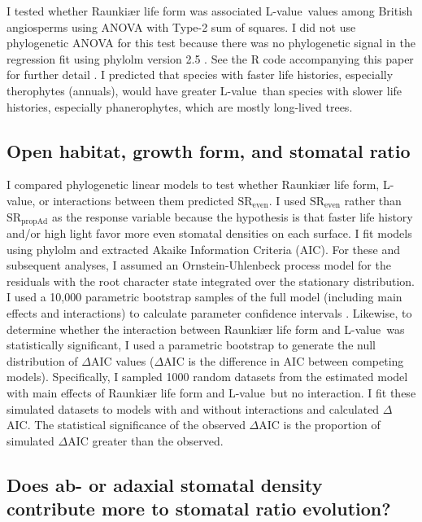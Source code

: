 \documentclass[12pt, oneside]{article}
\newcommand{\pkg}[1]{{\fontseries{b}\selectfont #1}}
\newcommand{\el}{L-value}
\begin{document}
I tested whether Raunki\ae r life form was associated \el~values among British angiosperms using ANOVA with Type-2 sum of squares. I did not use phylogenetic ANOVA for this test because there was no phylogenetic signal in the regression fit using \pkg{phylolm} version 2.5 \citep{Ho_Ane_2014}. See the R code accompanying this paper for further detail \citep{Muir_dryad}. I predicted that species with faster life histories, especially therophytes (annuals), would have greater \el~than species with slower life histories, especially phanerophytes, which are mostly long-lived trees. 

\subsection*{Open habitat, growth form, and stomatal ratio}

  
I compared phylogenetic linear models to test whether Raunki\ae r life form, \el, or interactions between them predicted $\textrm{SR}_\textrm{even}$. I used $\textrm{SR}_\textrm{even}$ rather than $\textrm{SR}_\textrm{propAd}$ as the response variable because the hypothesis is that faster life history and/or high light favor more even stomatal densities on each surface. I fit models using \pkg{phylolm} and extracted Akaike Information Criteria (AIC). For these and subsequent analyses, I assumed an Ornstein-Uhlenbeck process model for the residuals with the root character state integrated over the stationary distribution. I used a 10,000 parametric bootstrap samples of the full model (including main effects and interactions) to calculate parameter confidence intervals \citep{Boettiger_etal_2012}. Likewise, to determine whether the interaction between Raunki\ae r life form and \el~was statistically significant, I used a parametric bootstrap to generate the null distribution of $\Delta$AIC values ($\Delta$AIC is the difference in AIC between competing models). Specifically, I sampled 1000 random datasets from the estimated model with main effects of Raunki\ae r life form and \el~but no interaction. I fit these simulated datasets to models with and without interactions and  calculated $\Delta$AIC. The statistical significance of the observed $\Delta$AIC is the proportion of simulated $\Delta$AIC greater than the observed.

\subsection*{Does ab- or adaxial stomatal density contribute more to stomatal ratio evolution?}
\end{document}
